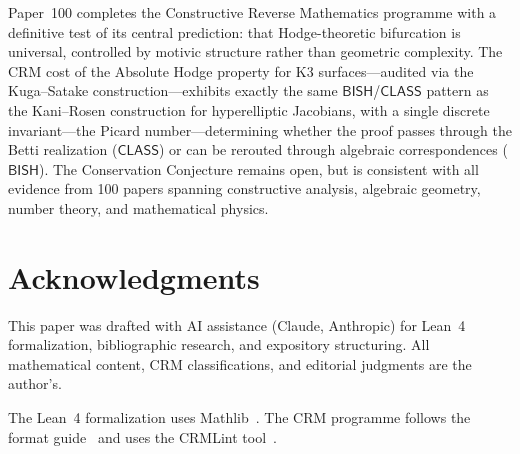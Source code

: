 \documentclass[11pt,a4paper]{article}
\theoremstyle{plain}
\theoremstyle{definition}
\newcommand{\BISH}{\textsf{BISH}}
\newcommand{\CLASS}{\textsf{CLASS}}
\begin{document}
Paper~100 completes the Constructive Reverse Mathematics programme with a definitive test of its central prediction: that Hodge-theoretic bifurcation is universal, controlled by motivic structure rather than geometric complexity. The CRM cost of the Absolute Hodge property for K3 surfaces---audited via the Kuga--Satake construction---exhibits exactly the same $\BISH$/$\CLASS$ pattern as the Kani--Rosen construction for hyperelliptic Jacobians, with a single discrete invariant---the Picard number---determining whether the proof passes through the Betti realization ($\CLASS$) or can be rerouted through algebraic correspondences ($\BISH$). The Conservation Conjecture remains open, but is consistent with all evidence from 100 papers spanning constructive analysis, algebraic geometry, number theory, and mathematical physics.


\section*{Acknowledgments}

This paper was drafted with AI assistance (Claude, Anthropic) for Lean~4 formalization, bibliographic research, and expository structuring. All mathematical content, CRM classifications, and editorial judgments are the author's.

The Lean~4 formalization uses Mathlib~\cite{mathlib}. The CRM programme follows the format guide~\cite{lee-format-guide} and uses the CRMLint tool~\cite{lee-p76}.
\end{document}
